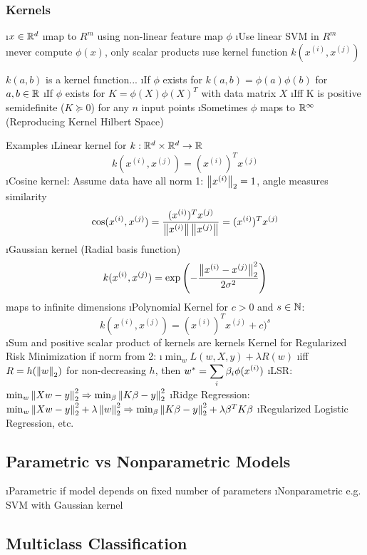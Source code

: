 \subsubsection{Kernels}

\bi
\i $x \in \mathbb{R}^d$
\i map to $R^m$ using non-linear feature map $\phi$
\i Use linear SVM in $R^m$
\i never compute $\phi(x)$, only scalar products
\i use kernel function $k(x^{(i)}, x^{(j)})$
\ei


$k(a,b)$ is a kernel function... 
\bi 
\i If $\phi$ exists for $k(a,b) = \phi(a)\phi(b)$ for $a,b \in \mathbb{R}$
\i If $\phi$ exists for $K = \phi(X)\phi(X)^T$ with data matrix $X$
\i Iff K is positive semidefinite ($K \succcurlyeq 0$) for any $n$ input points 
\bi
\i Sometimes $\phi$ maps to $\mathbb{R}^\infty$ (Reproducing Kernel Hilbert Space)
\ei
\ei

Examples
\bi
\i Linear kernel for $k: \mathbb{R}^d \times \mathbb{R}^d \to \mathbb{R}$ \[k(x^{(i)}, x^{(j)}) = (x^{(i)})^T x^{(j)}\]
\i Cosine kernel: Assume data have all norm 1: $\left\lVert x^{(i)}\right\rVert_2 = 1$, angle measures similarity
\[
\cos(x^{(i)}, x^{(j)}) = \frac{(x^{(i)})^T x^{(j)}}{\left\lVert x^{(i)}\right\rVert \left\lVert x^{(j)}\right\rVert} = (x^{(i)})^T x^{(j)}
\]
\i Gaussian kernel (Radial basis function) \[
k(x^{(i)}, x^{(j)}) = \exp\left(-\frac{\left\lVert x^{(i)} - x^{(j)}\right\rVert_2^2}{2\sigma^2}\right)
\]
maps to infinite dimensions
\i Polynomial Kernel for $c > 0$ and $s \in \mathbb{N}$:
\[
k(x^{(i)}, x^{(j)}) = (x^{(i)})^T x^{(j)} + c)^s
\]
\i Sum and positive scalar product of kernels are kernels
\ei
\newpage
Kernel for Regularized Risk Minimization if norm from 2:
\bi
\i $\min_w L(w,X,y) + \lambda R(w)$
\i iff $R = h(\left\lVert w\right\rVert_2)$ for non-decreasing $h$, then $w^* = \displaystyle\sum_i \beta_i \phi(x^{(i)})$
\i LSR: $\min_w \left\lVert Xw-y\right\rVert^2_2 \Rightarrow \min_\beta \left\lVert K\beta - y\right\rVert^2_2$ 
\i Ridge Regression: $\min_w \left\lVert Xw-y\right\rVert^2_2 + \lambda \left\lVert w\right\rVert_2^2 \Rightarrow \min_\beta \left\lVert K\beta - y\right\rVert^2_2 + \lambda \beta^T K \beta$
\i Regularized Logistic Regression, etc.
\ei

\subsection{Parametric vs Nonparametric Models}

\bi
\i Parametric if model depends on fixed number of parameters
\i Nonparametric e.g. SVM with Gaussian kernel
\ei

\subsection{Multiclass Classification}

